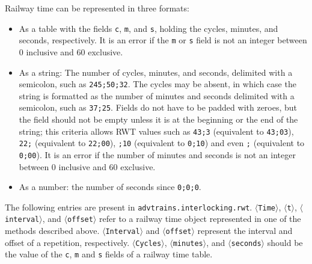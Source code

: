 \documentclass[notitlepage]{article}
\newcommand{\var}[1]{$\langle$\texttt{#1}$\rangle$}
\newcommand{\var}[1]{$\mathit{\langle}$\textrm{\textmd{\textit{#1}}}$\mathit{\rangle}$}
\begin{document}
Railway time can be represented in three formats:
\begin{itemize}
\item As a table with the fields \texttt{c}, \texttt{m}, and \texttt{s}, holding the cycles, minutes, and seconds, respectively. It is an error if the \texttt{m} or \texttt{s} field is not an integer between 0 inclusive and 60 exclusive.
\item As a string: The number of cycles, minutes, and seconds, delimited with a semicolon, such as \texttt{245;50;32}. The cycles may be absent, in which case the string is formatted as the number of minutes and seconds delimited with a semicolon, such as \texttt{37;25}. Fields do not have to be padded with zeroes, but the field should not be empty unless it is at the beginning or the end of the string; this criteria allows RWT values such as \texttt{43;3} (equivalent to \texttt{43;03}), \texttt{22;} (equivalent to \texttt{22;00}), \texttt{;10} (equivalent to \texttt{0;10}) and even \texttt{;} (equivalent to \texttt{0;00}). It is an error if the number of minutes and seconds is not an integer between 0 inclusive and 60 exclusive.
\item As a number: the number of seconds since \texttt{0;0;0}.
\end{itemize}

The following entries are present in \texttt{advtrains.interlocking.rwt}. \var{Time}, \var{t}, \var{interval}, and \var{offset} refer to a railway time object represented in one of the methods described above. \var{Interval} and \var{offset} represent the interval and offset of a repetition, respectively. \var{Cycles}, \var{minutes}, and \var{seconds} should be the value of the \texttt{c}, \texttt{m} and \texttt{s} fields of a railway time table.
\end{document}
